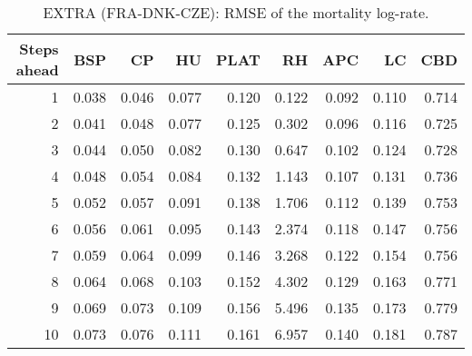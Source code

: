 % 
\begin{table}[ht]
\centering
\begin{tabular}{rrrrrrrrr}
  \hline
Steps ahead & BSP & CP & HU & PLAT & RH & APC & LC & CBD \\ 
  \hline
   1 & 0.038 & 0.046 & 0.077 & 0.120 & 0.122 & 0.092 & 0.110 & 0.714 \\ 
     2 & 0.041 & 0.048 & 0.077 & 0.125 & 0.302 & 0.096 & 0.116 & 0.725 \\ 
     3 & 0.044 & 0.050 & 0.082 & 0.130 & 0.647 & 0.102 & 0.124 & 0.728 \\ 
     4 & 0.048 & 0.054 & 0.084 & 0.132 & 1.143 & 0.107 & 0.131 & 0.736 \\ 
     5 & 0.052 & 0.057 & 0.091 & 0.138 & 1.706 & 0.112 & 0.139 & 0.753 \\ 
     6 & 0.056 & 0.061 & 0.095 & 0.143 & 2.374 & 0.118 & 0.147 & 0.756 \\ 
     7 & 0.059 & 0.064 & 0.099 & 0.146 & 3.268 & 0.122 & 0.154 & 0.756 \\ 
     8 & 0.064 & 0.068 & 0.103 & 0.152 & 4.302 & 0.129 & 0.163 & 0.771 \\ 
     9 & 0.069 & 0.073 & 0.109 & 0.156 & 5.496 & 0.135 & 0.173 & 0.779 \\ 
    10 & 0.073 & 0.076 & 0.111 & 0.161 & 6.957 & 0.140 & 0.181 & 0.787 \\ 
   \hline
\end{tabular}
\caption{EXTRA (FRA-DNK-CZE): RMSE of the mortality log-rate.} 
\end{table}
